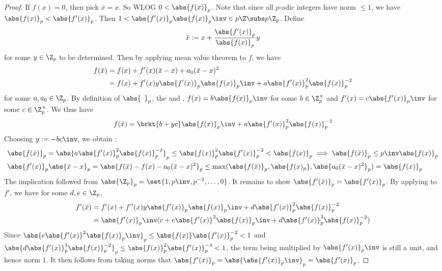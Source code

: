 \begin{proof}
  If $f(x) = 0$, then pick $\bar{x} = x$. 
  So WLOG $0 < \abs{f(x)}_p$. 
  Note that since all $p$-adic integers have 
  norm $\leq 1$, we have $\abs{f(x)}_p < \abs{f'(x)}_p$. 
  Then $1 < \abs{f'(x)}_p \abs{f(x)}_p\inv \in p\Z \subs p\Z_p$. 
  Define \[
    \bar{x} := x + \frac{\abs{f'(x)}_p}{\abs{f(x)}_p} y
  \]
  for some $y \in \Z_p$ to be determined. 
  Then by applying mean value theorem to $f$, we have \begin{align*}
    f(\bar{x}) 
    &= f(x) + f'(x)(\bar{x} - x) + a_0 (\bar{x} - x)^2 \\
    &= f(x) + f'(x) y \abs{f'(x)}_p \abs{f(x)}_p\inv
    + a \abs{f'(x)}_p^2 \abs{f(x)}_p^{-2}
  \end{align*}
  for some $a, a_0 \in \Z_p$.
  By definition of $\abs{\hspace{5pt}}_p$, 
  the  and 
  , 
  $f(x) = b \abs{f(x)}_p\inv$ for some $b \in \Z_p^\times$
  and $f'(x) = c \abs{f'(x)}_p\inv$ for some $c \in \Z_p^\times$.
  We thus have \[
    f(\bar{x}) = \brkt{b + y c}\abs{f(x)}_p\inv 
    + a \abs{f'(x)}_p^2 \abs{f(x)}_p^{-2}
  \]
  Choosing $y := -bc\inv$, we obtain : 
  \begin{align*}
    &\abs{f(\bar{x})}_p = \abs{a \abs{f'(x)}_p^2 \abs{f(x)}_p^{-2}}_p
    \leq \abs{f(x)}_p^2 \abs{f'(x)}_p^{-2} < \abs{f(x)}_p 
    \implies \abs{f(\bar{x})}_p \leq p\inv \abs{f(x)}_p \\
    &\abs{f'(x)}_p \abs{\bar{x} - x}_p
    = \abs{f(\bar{x}) - f(x) - a_0 (\bar{x}-x)^2}_p
    \leq \max(\abs{f(\bar{x})}_p,\abs{f(x)_p},\abs{a_0 (\bar{x}-x)^2}_p)
    = \abs{f(x)}_p 
  \end{align*}
  The implication followed from 
  $\abs{\Z_p}_p = \set{1, p\inv, p^{-2}, \dots, 0}$.
  It remains to show $\abs{f'(\bar{x})}_p = \abs{f'(x)}_p$. 
  By applying  to $f'$, 
  we have for some $d, e \in \Z_p$, \begin{align*}
    f'(\bar{x})
    &= f'(x) + f''(x) y \abs{f'(x)}_p\abs{f(x)}_p\inv 
    + d  \abs{f'(x)}_p^2 \abs{f(x)}_p^{-2} \\
    &= \abs{f'(x)}_p\inv (c + e \abs{f'(x)}^2\abs{f(x)}_p\inv 
    + d \abs{f'(x)}_p^3 \abs{f(x)}_p^{-2}) 
  \end{align*}
  Since $\abs{e \abs{f'(x)}^2\abs{f(x)}_p\inv}_p \leq 
  \abs{f(x)}\abs{f'(x)}_p^{-2} < 1$ and 
  $\abs{d \abs{f'(x)}_p^3 \abs{f(x)}_p^{-2}}_p \leq 
  \abs{f(x)}_p^{2} \abs{f'(x)}_p^{-4} < 1$,
  the term being multiplied by $\abs{f'(x)}_p\inv$ is still a unit, 
  and hence norm $1$. 
  It then follows from taking norms that 
  $\abs{f'(\bar{x})}_p = \abs{\abs{f'(x)}_p\inv}_p = \abs{f'(x)}_p$.
\end{proof}

